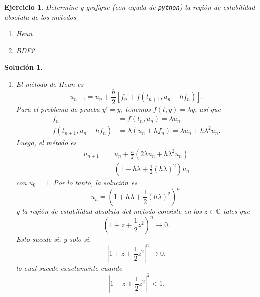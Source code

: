 \documentclass[11pt]{article}
\newtheorem{exercise}{Ejercicio}
\newtheorem*{sol}{Solución}
\newcommand\C{\mathbb C}
\begin{document}
\begin{exercise}
  Determine y grafique (con ayuda de \texttt{python}) la región de
  estabilidad absoluta de los métodos
  \begin{enumerate}
    \item
      Heun
    \item
      BDF2
  \end{enumerate}
\end{exercise}
\begin{sol}
  \begin{enumerate}
    \item
      El método de Heun es
      \begin{equation}
        u_{n+1} = u_n + \frac{h}{2}[f_n + f(t_{n+1},u_n+hf_n)]
      .\end{equation}
      Para el problema de prueba $y'=y$, tenemos $f(t,y)=\lambda y$, así
      que
      \begin{align}
        f_n
          &= f(t_n,u_n)
          = \lambda u_n \\
        f(t_{n+1},u_{n}+hf_n)
          &= \lambda(u_{n}+hf_n)
          = \lambda u_n + h\lambda^{2} u_n
      .\end{align}
      Luego, el método es
      \begin{align}
        u_{n+1}
        &= u_n + \frac{h}{2}(2\lambda u_n + h\lambda^{2} u_n) \\
        &= \left(1 + h\lambda + \frac{1}{2}(h\lambda)^{2}\right) u_n
      \end{align}
      con $u_0=1$.
      Por lo tanto, la solución es
      \begin{equation}
        u_n = \left(1 + h\lambda + \frac{1}{2}(h\lambda)^{2}\right)^{n}
      .\end{equation}
      y la región de estabilidad absoluta del método consiste en los
      $z\in\C$ tales que
      \begin{equation}
        \left(1 + z + \frac{1}{2}z^{2}\right)^{n} \to 0
      .\end{equation}
      Esto sucede si, y solo si, 
      \begin{equation}
        \left|1 + z + \frac{1}{2}z^{2}\right|^{n} \to 0
      .\end{equation}
      lo cual sucede exactamente cuando
      \begin{equation}
        \left|1 + z + \frac{1}{2}z^{2}\right|^{2}<1
      .\end{equation}

\end{enumerate}
\end{sol}
\end{document}
